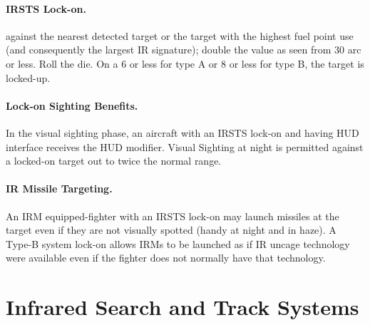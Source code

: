 \begin{advancedrules}
{\paragraph{IRSTS Lock-on.}  against the nearest detected target or the target with the highest fuel point use (and consequently the largest IR signature); double the value as seen from 30{\deg} arc or less.  Roll the die. On a 6 or less for type A or 8 or less for type B, the target is locked-up. 


\paragraph{Lock-on Sighting Benefits.} In the visual sighting phase, an aircraft with an IRSTS lock-on and having HUD interface receives the HUD modifier. Visual Sighting at night is permitted against a locked-on target out to twice the normal range.

\paragraph{IR Missile Targeting.} An IRM equipped-fighter with an IRSTS lock-on may launch missiles at the target even if they are not visually spotted (handy at night and in haze).  A Type-B system lock-on allows IRMs to be launched as if IR uncage technology were available even if the fighter does not normally have that technology.
}{

\section{Infrared Search and Track Systems}
\label{rule:irsts}

}
\end{advancedrules}
